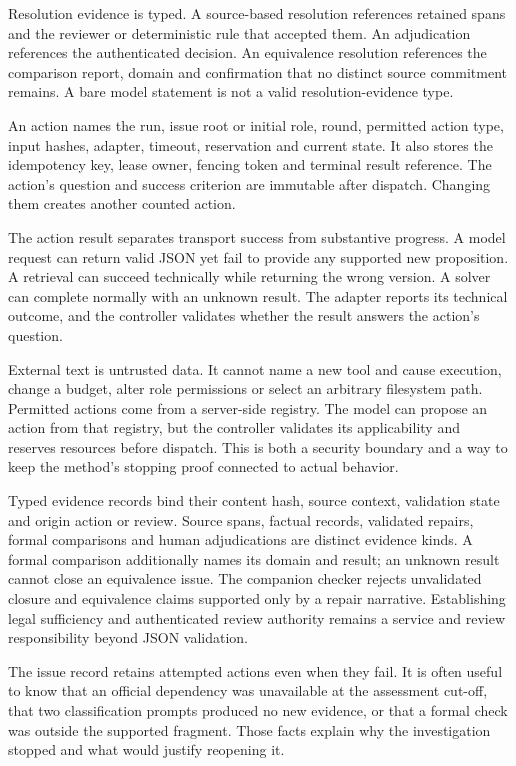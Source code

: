 \documentclass[12pt,a4paper,oneside,openany]{book}
\begin{document}
Resolution evidence is typed. A source-based resolution references retained spans
and the reviewer or deterministic rule that accepted them. An adjudication
references the authenticated decision. An equivalence resolution references the
comparison report, domain and confirmation that no distinct source commitment
remains. A bare model statement is not a valid resolution-evidence type.

An action names the run, issue root or initial role, round, permitted action type,
input hashes, adapter, timeout, reservation and current state. It also stores the
idempotency key, lease owner, fencing token and terminal result reference. The
action's question and success criterion are immutable after dispatch. Changing
them creates another counted action.

The action result separates transport success from substantive progress. A model
request can return valid JSON yet fail to provide any supported new proposition.
A retrieval can succeed technically while returning the wrong version. A solver
can complete normally with an unknown result. The adapter reports its technical
outcome, and the controller validates whether the result answers the action's
question.

External text is untrusted data. It cannot name a new tool and cause execution,
change a budget, alter role permissions or select an arbitrary filesystem path.
Permitted actions come from a server-side registry. The model can propose an
action from that registry, but the controller validates its applicability and
reserves resources before dispatch. This is both a security boundary and a way to
keep the method's stopping proof connected to actual behavior.

Typed evidence records bind their content hash, source context, validation state
and origin action or review. Source spans, factual records, validated repairs,
formal comparisons and human adjudications are distinct evidence kinds. A formal
comparison additionally names its domain and result; an unknown result cannot
close an equivalence issue. The companion checker rejects unvalidated closure
and equivalence claims supported only by a repair narrative. Establishing legal
sufficiency and authenticated review authority remains a service and review
responsibility beyond JSON validation.

The issue record retains attempted actions even when they fail. It is often useful
to know that an official dependency was unavailable at the assessment cut-off,
that two classification prompts produced no new evidence, or that a formal check
was outside the supported fragment. Those facts explain why the investigation
stopped and what would justify reopening it.
\end{document}
